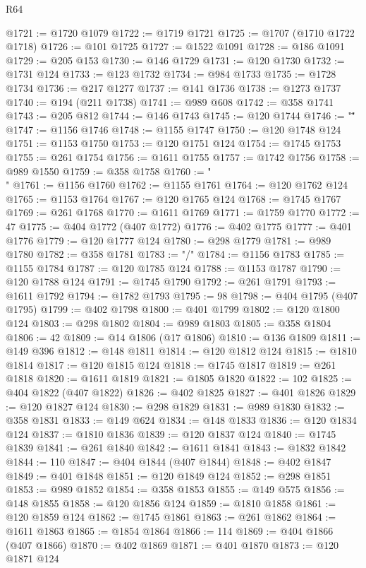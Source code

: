 \begin{lexlean}{R64}
\begin{coremodule}
@1721 := @1720 @1079
@1722 := @1719 @1721
@1725 := @1707 (@1710 @1722 @1718)
@1726 := @101 @1725
@1727 := @1522 @1091
@1728 := @186 @1091
@1729 := @205 @153
@1730 := @146 @1729
@1731 := @120 @1730
@1732 := @1731 @124
@1733 := @123 @1732
@1734 := @984 @1733
@1735 := @1728 @1734
@1736 := @217 @1277
@1737 := @141 @1736
@1738 := @1273 @1737
@1740 := @194 (@211 @1738)
@1741 := @989 @608
@1742 := @358 @1741
@1743 := @205 @812
@1744 := @146 @1743
@1745 := @120 @1744
@1746 := "\""
@1747 := @1156 @1746
@1748 := @1155 @1747
@1750 := @120 @1748 @124
@1751 := @1153 @1750
@1753 := @120 @1751 @124
@1754 := @1745 @1753
@1755 := @261 @1754
@1756 := @1611 @1755
@1757 := @1742 @1756
@1758 := @989 @1550
@1759 := @358 @1758
@1760 := "\\"
@1761 := @1156 @1760
@1762 := @1155 @1761
@1764 := @120 @1762 @124
@1765 := @1153 @1764
@1767 := @120 @1765 @124
@1768 := @1745 @1767
@1769 := @261 @1768
@1770 := @1611 @1769
@1771 := @1759 @1770
@1772 := 47
@1775 := @404 @1772 (@407 @1772)
@1776 := @402 @1775
@1777 := @401 @1776
@1779 := @120 @1777 @124
@1780 := @298 @1779
@1781 := @989 @1780
@1782 := @358 @1781
@1783 := "/"
@1784 := @1156 @1783
@1785 := @1155 @1784
@1787 := @120 @1785 @124
@1788 := @1153 @1787
@1790 := @120 @1788 @124
@1791 := @1745 @1790
@1792 := @261 @1791
@1793 := @1611 @1792
@1794 := @1782 @1793
@1795 := 98
@1798 := @404 @1795 (@407 @1795)
@1799 := @402 @1798
@1800 := @401 @1799
@1802 := @120 @1800 @124
@1803 := @298 @1802
@1804 := @989 @1803
@1805 := @358 @1804
@1806 := 42
@1809 := @14 @1806 (@17 @1806)
@1810 := @136 @1809
@1811 := @149 @396
@1812 := @148 @1811
@1814 := @120 @1812 @124
@1815 := @1810 @1814
@1817 := @120 @1815 @124
@1818 := @1745 @1817
@1819 := @261 @1818
@1820 := @1611 @1819
@1821 := @1805 @1820
@1822 := 102
@1825 := @404 @1822 (@407 @1822)
@1826 := @402 @1825
@1827 := @401 @1826
@1829 := @120 @1827 @124
@1830 := @298 @1829
@1831 := @989 @1830
@1832 := @358 @1831
@1833 := @149 @624
@1834 := @148 @1833
@1836 := @120 @1834 @124
@1837 := @1810 @1836
@1839 := @120 @1837 @124
@1840 := @1745 @1839
@1841 := @261 @1840
@1842 := @1611 @1841
@1843 := @1832 @1842
@1844 := 110
@1847 := @404 @1844 (@407 @1844)
@1848 := @402 @1847
@1849 := @401 @1848
@1851 := @120 @1849 @124
@1852 := @298 @1851
@1853 := @989 @1852
@1854 := @358 @1853
@1855 := @149 @575
@1856 := @148 @1855
@1858 := @120 @1856 @124
@1859 := @1810 @1858
@1861 := @120 @1859 @124
@1862 := @1745 @1861
@1863 := @261 @1862
@1864 := @1611 @1863
@1865 := @1854 @1864
@1866 := 114
@1869 := @404 @1866 (@407 @1866)
@1870 := @402 @1869
@1871 := @401 @1870
@1873 := @120 @1871 @124

\end{coremodule}
\end{lexlean}
